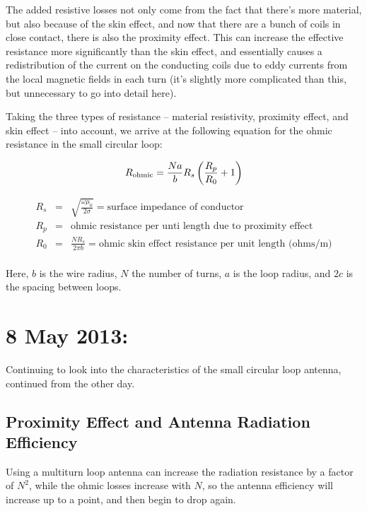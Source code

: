 \documentclass[12pt,onecolumn,titlepage]{article}
\begin{document}
The added resistive losses not only come from the fact that there's more material, but also because of the skin effect, and now that there are a bunch of coils in close contact, there is also the proximity effect. This can increase the effective resistance more significantly than the skin effect, and essentially causes a redistribution of the current on the conducting coils due to eddy currents from the local magnetic fields in each turn (it's slightly more complicated than this, but unnecessary to go into detail here). 

Taking the three types of resistance -- material resistivity, proximity effect, and skin effect -- into account, we arrive at the following equation for the ohmic resistance in the small circular loop:

\[ R_{{\rm{ohmic}}} = \frac{Na}{b} R_s \left( \frac{R_p}{R_0} + 1 \right) \]

\begin{eqnarray*}
R_s &=& \sqrt{ \frac{\omega \mu_0}{2\sigma} } = {\text{surface impedance of conductor}} \\
R_p &=& {\text{ohmic resistance per unti length due to proximity effect}} \\
R_0 &=& \frac{NR_s}{2\pi b} = {\text{ohmic skin effect resistance per unit length (ohms/m)}} \\
\end{eqnarray*}

Here, $b$ is the wire radius, $N$ the number of turns, $a$ is the loop radius, and $2c$ is the spacing between loops.





\clearpage
\section{8 May 2013:}

\indent \indent Continuing to look into the characteristics of the small circular loop antenna, continued from the other day.

\subsection{Proximity Effect and Antenna Radiation Efficiency}
\indent \indent Using a multiturn loop antenna can increase the radiation resistance by a factor of $N^2$, while the ohmic losses increase with $N$, so the antenna efficiency will increase up to a point, and then begin to drop again.
\end{document}
